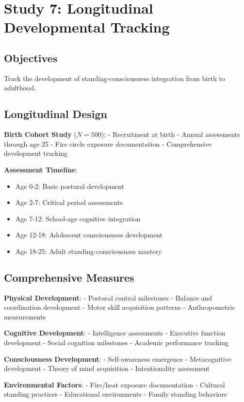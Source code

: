 \documentclass[12pt]{article}
\begin{document}
\section{Study 7: Longitudinal Developmental Tracking}

\subsection{Objectives}

Track the development of standing-consciousness integration from birth to adulthood.

\subsection{Longitudinal Design}

\textbf{Birth Cohort Study} ($N = 500$):
- Recruitment at birth
- Annual assessments through age 25
- Fire circle exposure documentation
- Comprehensive development tracking

\textbf{Assessment Timeline}:
\begin{itemize}
\item Age 0-2: Basic postural development
\item Age 2-7: Critical period assessments
\item Age 7-12: School-age cognitive integration
\item Age 12-18: Adolescent consciousness development
\item Age 18-25: Adult standing-consciousness mastery
\end{itemize}

\subsection{Comprehensive Measures}

\textbf{Physical Development}:
- Postural control milestones
- Balance and coordination development
- Motor skill acquisition patterns
- Anthropometric measurements

\textbf{Cognitive Development}:
- Intelligence assessments
- Executive function development
- Social cognition milestones
- Academic performance tracking

\textbf{Consciousness Development}:
- Self-awareness emergence
- Metacognitive development
- Theory of mind acquisition
- Intentionality assessment

\textbf{Environmental Factors}:
- Fire/heat exposure documentation
- Cultural standing practices
- Educational environments
- Family standing behaviors
\end{document}

